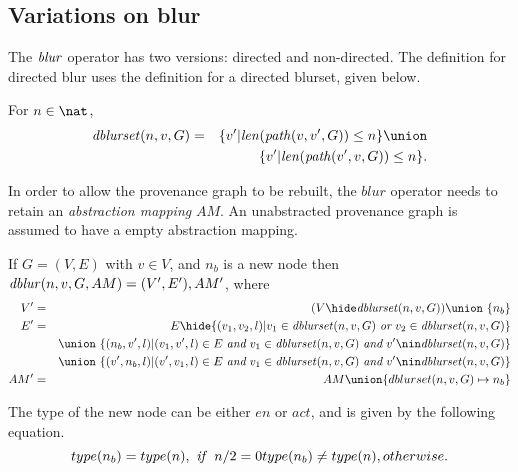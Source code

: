 \documentclass{elsarticle}
\begin{document}
\subsection{Variations on blur}


The $\mathit{blur}$ operator has two versions: directed and non-directed. The definition for directed blur uses the definition for a directed blurset, given below.

\begin{definition} \label{def:directed-blurset}
  For $n \in \nat$,
  \begin{eqnarray*}
    \dblurset(n,v,G) & = & \{v'|\len(\Path(v,v',G)) \leq n\}\union \\
                     &   & \{v'|\len(\Path(v',v,G)) \leq n\}.
  \end{eqnarray*}
\end{definition}

In order to allow the provenance graph to be rebuilt, the $blur$ operator needs to retain an \emph{abstraction mapping} $AM$. An unabstracted provenance graph is assumed to have a empty abstraction mapping. 

\begin{definition} \label{def:directed-blur}
  If $G = (V,E)$ with $v \in V$, and $n_b$ is a new node then $\mathit{dblur}(n,v,G,AM) = (V',E'),AM'$, where
  \begin{eqnarray*}
  V' &=& (V\hide \dblurset(n,v,G)) \union\ \{n_b\}\\
  E' &=& E\hide \{(v_1,v_2,l)| v_1 \in \dblurset(n,v,G) ~\emph{or}~ v_2 \in \dblurset(n,v,G)\}\\
  &&\union\ \{(n_b,v',l)|(v_1,v',l) \in E ~\emph{and}~ v_1 \in \dblurset(n,v,G) ~\emph{and}~ v' \nin \dblurset(n,v,G) \}\\
  &&\union\ \{(v',n_b,l)|(v',v_1,l) \in E ~\emph{and}~ v_1 \in \dblurset(n,v,G)  ~\emph{and}~ v' \nin \dblurset(n,v,G) \} \\
  AM' & = & AM \union \{dblurset(n,v,G) \mapsto n_b\}\\  
  \end{eqnarray*}
\end{definition}

The type of the new node can be either $en$ or $act$, and is given by the following equation. 
\[
type(n_b) = type(n), ~\emph{if}~~ n/2 = 0\\
type(n_b) \ne type(n), otherwise.
\]
\end{document}
